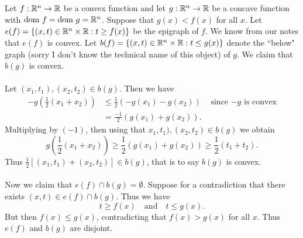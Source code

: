\documentclass[letterpaper,12pt,oneside,onecolumn]{article}
\begin{document}
\section{}
\paragraph{}
Let $f : \mathbb{R}^n \rightarrow \mathbb{R}$ be a convex function and let $g : \mathbb{R}^n \rightarrow \mathbb{R}$ be a concave function with $\text{dom } f = \text{dom } g = \mathbb{R}^n$. Suppose that $g(x) < f(x)$ for all $x$. Let $e(f) = \{(x,t) \in \mathbb{R}^n \times \mathbb{R}: t \geq f(x) \}$ be the epigraph of $f$. We know from our notes that $e(f)$ is convex. Let $b(f) = \{(x,t) \in \mathbb{R}^n \times \mathbb{R}: t \leq g(x)\}$ denote the ``below" graph (sorry I don't know the technical name of this object) of $g$. We claim that $b(g)$ is convex.
\paragraph{}
Let $(x_1, t_1), (x_2, t_2) \in b(g)$. Then we have
\begin{align*}
-g(\frac{1}{2}(x_1 + x_2)) &\leq \frac{1}{2}(-g(x_1) - g(x_2)) &\text{ since $-g$ is convex} \\
&=\frac{-1}{2}(g(x_1) + g(x_2)).
\end{align*}
Multiplying by $(-1)$, then using that $x_1, t_1), (x_2, t_2) \in b(g)$ we obtain
$$g(\frac{1}{2}(x_1 + x_2)) \geq \frac{1}{2}(g(x_1) + g(x_2)) \geq \frac{1}{2}(t_1 + t_2).$$
Thus $\frac{1}{2}[(x_1,t_1) + (x_2,t_2)] \in b(g)$, that is to say $b(g)$ is convex.
\paragraph{}
Now we claim that $e(f) \cap b(g) = \emptyset$. Suppose for a contradiction that there exists $(x,t) \in e(f) \cap b(g)$. Thus we have
$$t \geq f(x) \quad \text{and}\quad t \leq g(x).$$
But then $f(x) \leq g(x)$, contradicting that $f(x) > g(x)$ for all $x$. Thus $e(f)$ and $b(g)$ are disjoint.
\end{document}
